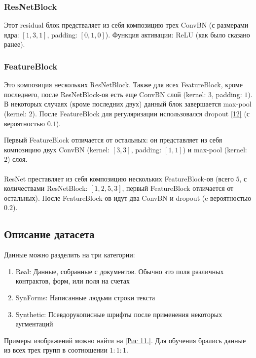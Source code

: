 \subsubsection{ResNetBlock}
Этот residual блок предстваляет из себя композицию трех ConvBN (с размерами ядра: $[1, 3, 1]$, padding: $[0, 1, 0]$). Функция активации: ReLU (как было сказано ранее).

\subsubsection{FeatureBlock}
Это композиция нескольких ResNetBlock. Также для всех FeatureBlock, кроме последнего, после ResNetBlock-ов есть еще ConvBN слой (kernel: $3$, padding: $1$). В некоторых случаях (кроме последних двух) данный блок завершается max-pool (kernel: $2$). После FeatureBlock для регуляризации использовался dropout \hyperlink{cite.Sut14}{[12]} (с вероятностью $0.1$).

Первый FeatureBlock отличается от остальных: он представляет из себя композицию двух ConvBN (kernel: $[3, 3]$, padding: $[1, 1]$) и max-pool (kernel: $2$) слоя.

\paragraph{}

ResNet преставляет из себя композицию нескольких FeatureBlock-ов (всего $5$, с количествами ResNetBlock: $[1, 2, 5, 3]$, первый FeatureBlock отличается от остальных). После FeatureBlock-ов идут два ConvBN и dropout (c вероятностью $0.2$). 


\subsection{Описание датасета}

Данные можно разделить на три категории:
\begin{enumerate}
\item Real: Данные, собранные с документов. Обычно это поля различных контрактов, форм, или поля на счетах
\item SynForms: Написанные людьми строки текста
\item Synthetic: Псевдорукописные шрифты после применения некоторых аугментаций
\end{enumerate}
Примеры изображений можно найти на \hyperlink{image11}{[Рис 11.]}. Для обучения брались данные из всех трех групп в соотношении $1:1:1$.

